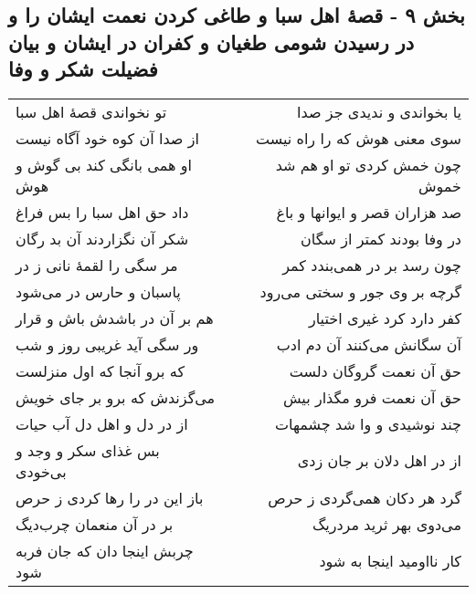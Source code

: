 \begin{center}
\section*{بخش ۹ - قصهٔ اهل سبا و طاغی کردن نعمت ایشان را و  در رسیدن شومی طغیان و کفران در ایشان و بیان فضیلت شکر و وفا}
\label{sec:sh009}
\begin{longtable}{l p{0.5cm} r}
تو نخواندی قصهٔ اهل سبا
&&
یا بخواندی و ندیدی جز صدا
\\
از صدا آن کوه خود آگاه نیست
&&
سوی معنی هوش که را راه نیست
\\
او همی بانگی کند بی گوش و هوش
&&
چون خمش کردی تو او هم شد خموش
\\
داد حق اهل سبا را بس فراغ
&&
صد هزاران قصر و ایوانها و باغ
\\
شکر آن نگزاردند آن بد رگان
&&
در وفا بودند کمتر از سگان
\\
مر سگی را لقمهٔ نانی ز در
&&
چون رسد بر در همی‌بندد کمر
\\
پاسبان و حارس در می‌شود
&&
گرچه بر وی جور و سختی می‌رود
\\
هم بر آن در باشدش باش و قرار
&&
کفر دارد کرد غیری اختیار
\\
ور سگی آید غریبی روز و شب
&&
آن سگانش می‌کنند آن دم ادب
\\
که برو آنجا که اول منزلست
&&
حق آن نعمت گروگان دلست
\\
می‌گزندش که برو بر جای خویش
&&
حق آن نعمت فرو مگذار بیش
\\
از در دل و اهل دل آب حیات
&&
چند نوشیدی و وا شد چشمهات
\\
بس غذای سکر و وجد و بی‌خودی
&&
از در اهل دلان بر جان زدی
\\
باز این در را رها کردی ز حرص
&&
گرد هر دکان همی‌گردی ز حرص
\\
بر در آن منعمان چرب‌دیگ
&&
می‌دوی بهر ثرید مردریگ
\\
چربش اینجا دان که جان فربه شود
&&
کار نااومید اینجا به شود
\\
\end{longtable}
\end{center}

